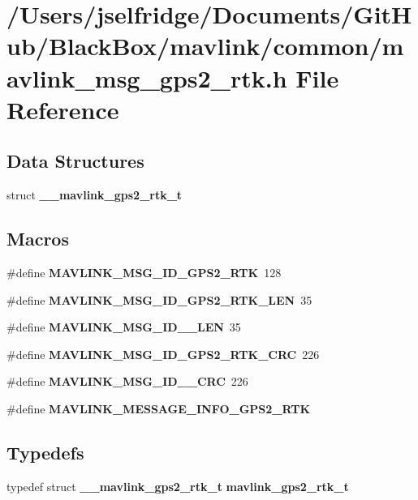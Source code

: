 \section{/\+Users/jselfridge/\+Documents/\+Git\+Hub/\+Black\+Box/mavlink/common/mavlink\+\_\+msg\+\_\+gps2\+\_\+rtk.h File Reference}
\label{mavlink__msg__gps2__rtk_8h}
\subsection*{Data Structures}
\begin{DoxyCompactItemize}
\item 
struct \textbf{ \+\_\+\+\_\+mavlink\+\_\+gps2\+\_\+rtk\+\_\+t}
\end{DoxyCompactItemize}
\subsection*{Macros}
\begin{DoxyCompactItemize}
\item 
\#define \textbf{ M\+A\+V\+L\+I\+N\+K\+\_\+\+M\+S\+G\+\_\+\+I\+D\+\_\+\+G\+P\+S2\+\_\+\+R\+TK}~128
\item 
\#define \textbf{ M\+A\+V\+L\+I\+N\+K\+\_\+\+M\+S\+G\+\_\+\+I\+D\+\_\+\+G\+P\+S2\+\_\+\+R\+T\+K\+\_\+\+L\+EN}~35
\item 
\#define \textbf{ M\+A\+V\+L\+I\+N\+K\+\_\+\+M\+S\+G\+\_\+\+I\+D\+\_\+\_\+\+L\+EN}~35
\item 
\#define \textbf{ M\+A\+V\+L\+I\+N\+K\+\_\+\+M\+S\+G\+\_\+\+I\+D\+\_\+\+G\+P\+S2\+\_\+\+R\+T\+K\+\_\+\+C\+RC}~226
\item 
\#define \textbf{ M\+A\+V\+L\+I\+N\+K\+\_\+\+M\+S\+G\+\_\+\+I\+D\+\_\+\_\+\+C\+RC}~226
\item 
\#define \textbf{ M\+A\+V\+L\+I\+N\+K\+\_\+\+M\+E\+S\+S\+A\+G\+E\+\_\+\+I\+N\+F\+O\+\_\+\+G\+P\+S2\+\_\+\+R\+TK}
\end{DoxyCompactItemize}
\subsection*{Typedefs}
\begin{DoxyCompactItemize}
\item 
typedef struct \textbf{ \+\_\+\+\_\+mavlink\+\_\+gps2\+\_\+rtk\+\_\+t} \textbf{ mavlink\+\_\+gps2\+\_\+rtk\+\_\+t}
\end{DoxyCompactItemize}


